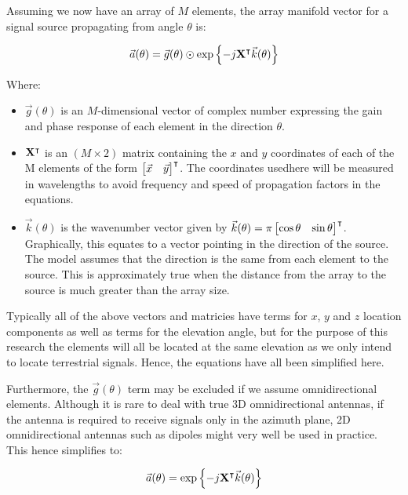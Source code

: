 Assuming we now have an array of \(M\) elements, the array manifold vector for a signal source propagating from angle \(\theta\) is: \cite{dacos1995estimating}

\begin{equation}
\vec{a}(\theta) = \vec{g}(\theta) \odot \exp \left\{ -j \mathbf{X}^\intercal \vec{k}(\theta) \right\}
\end{equation}

Where:
\begin{itemize}
  \item \(\vec{g}(\theta)\) is an \(M\)-dimensional vector of complex number expressing the gain and phase response  of each element in the direction \(\theta\). 
\item \(\mathbf{X}^\intercal\) is an \((M \times 2)\) matrix containing the \(x\) and \(y\) coordinates of each of the M elements of the form \(\begin{bmatrix} \vec{x} & \vec{y} \end{bmatrix}^\intercal\). The coordinates usedhere will be measured in wavelengths to avoid frequency and speed of propagation factors in the equations.
\item \(\vec{k}(\theta)\) is the wavenumber vector given by \(\vec{k}(\theta) = \pi \begin{bmatrix} \cos\theta & \sin\theta \end{bmatrix}^\intercal \). Graphically, this equates to a vector pointing in the direction of the source. The model assumes that the direction is the same from each element to the source. This is approximately true when the distance from the array to the source is much greater than the array size.
\end{itemize}

Typically all of the above vectors and matricies have terms for \(x\), \(y\) and \(z\) location components as well as terms for the elevation angle, but for the purpose of this research the elements will all be located at the same elevation as we only intend to locate terrestrial signals. Hence, the equations have all been simplified here.

Furthermore, the \(\vec{g}(\theta)\) term may be excluded if we assume omnidirectional elements. Although it is rare to deal with true 3D omnidirectional antennas, if the antenna is required to receive signals only in the azimuth plane, 2D omnidirectional antennas such as dipoles might very well be used in practice. This hence simplifies to:

\begin{equation}
  \vec{a}(\theta) = \exp \left\{ -j \mathbf{X}^\intercal \vec{k}(\theta) \right\}
\end{equation}

